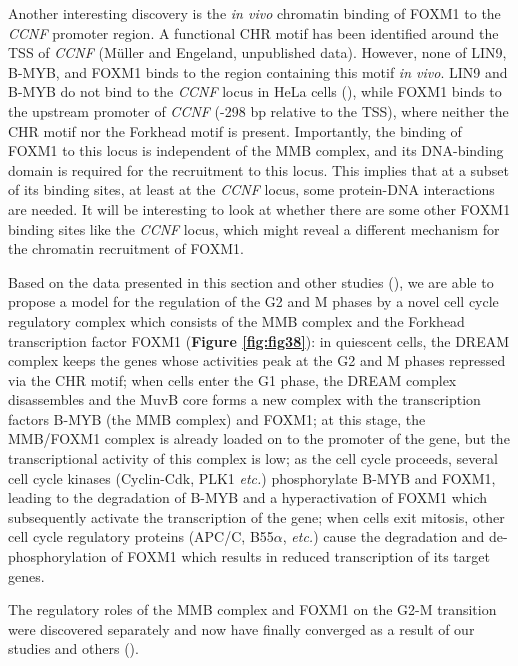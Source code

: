 Another interesting discovery is the \textit{in vivo} chromatin binding of FOXM1 to the \textit{CCNF} promoter region. A functional CHR motif has been identified around the TSS of \textit{CCNF} (Müller and Engeland, unpublished data). However, none of LIN9, B-MYB, and FOXM1 binds to the region containing this motif \textit{in vivo}. LIN9 and B-MYB do not bind to the \textit{CCNF} locus in HeLa cells (\cite{sadasivam2012the}), while FOXM1 binds to the upstream promoter of \textit{CCNF} (-298 bp relative to the TSS), where neither the CHR motif nor the Forkhead motif is present. Importantly, the binding of FOXM1 to this locus is independent of the MMB complex, and its DNA-binding domain is required for the recruitment to this locus. This implies that at a subset of its binding sites, at least at the \textit{CCNF} locus, some protein-DNA interactions are needed. It will be interesting to look at whether there are some other FOXM1 binding sites like the \textit{CCNF} locus, which might reveal a different mechanism for the chromatin recruitment of FOXM1.

Based on the data presented in this section and other studies (\cite{park2008anaphase-promoting,alvarez-fernández2011protein,müller2012the,sadasivam2012the}), we are able to propose a model for the regulation of the G2 and M phases by a novel cell cycle regulatory complex which consists of the MMB complex and the Forkhead transcription factor FOXM1 (\textbf{Figure \ref{fig:fig38}}): in quiescent cells, the DREAM complex keeps the genes whose activities peak at the G2 and M phases repressed via the CHR motif; when cells enter the G1 phase, the DREAM complex disassembles and the MuvB core forms a new complex with the transcription factors B-MYB (the MMB complex) and FOXM1; at this stage, the MMB/FOXM1 complex is already loaded on to the promoter of the gene, but the transcriptional activity of this complex is low; as the cell cycle proceeds, several cell cycle kinases (Cyclin-Cdk, PLK1 \textit{etc.}) phosphorylate B-MYB and FOXM1, leading to the degradation of B-MYB and a hyperactivation of FOXM1 which subsequently activate the transcription of the gene; when cells exit mitosis, other cell cycle regulatory proteins (APC/C, B55$\alpha$, \textit{etc.}) cause the degradation and de-phosphorylation of FOXM1 which results in reduced transcription of its target genes.

The regulatory roles of the MMB complex and FOXM1 on the G2-M transition were discovered separately and now have finally converged as a result of our studies and others (\cite{down2012binding,müller2012the,sadasivam2012the}).

